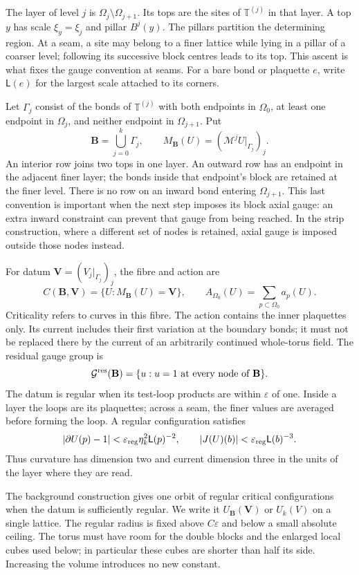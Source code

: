 \documentclass[11pt,letterpaper,reqno]{amsart}
\theoremstyle{definition}
\theoremstyle{remark}
\begin{document}
The layer of level $j$ is $\Omega_j\setminus\Omega_{j+1}$.
Its tops are the sites of $\mathbb T^{(j)}$ in that layer. A
top $y$ has scale $\xi_y=\xi_j$ and pillar $B^j(y)$.
The pillars partition the determining region. At a seam, a site
may belong to a finer lattice while lying in a pillar of a
coarser level; following its successive block centres leads to
its top. This ascent is what fixes the gauge convention at seams.
For a bare bond or plaquette $e$, write $\mathsf L(e)$ for the
largest scale attached to its corners.

Let $\Gamma_j$ consist of the bonds of $\mathbb T^{(j)}$
with both endpoints in $\Omega_0$, at least one endpoint in
$\Omega_j$, and neither endpoint in $\Omega_{j+1}$. Put
\[
 \mathbf B=\bigcup_{j=0}^k\Gamma_j,\qquad
 M_{\mathbf B}(U)=(\mathcal M^jU|_{\Gamma_j})_j.
\]
An interior row joins two tops in one layer. An outward row
has an endpoint in the adjacent finer layer; the bonds inside
that endpoint's block are retained at the finer level. There is
no row on an inward bond entering $\Omega_{j+1}$. This last
convention is important when the next step imposes its block
axial gauge: an extra inward constraint can prevent that gauge
from being reached. In the strip construction, where a different
set of nodes is retained, axial gauge is imposed outside those
nodes instead.

For datum $\mathbf V=(V_j|_{\Gamma_j})_j$, the fibre and action
are
\[
 C(\mathbf B,\mathbf V)=\{U:M_{\mathbf B}(U)=\mathbf V\},
 \qquad A_{\Omega_0}(U)=\sum_{p\subset\Omega_0}a_p(U).
\]
Criticality refers to curves in this fibre. The action contains
the inner plaquettes only. Its current includes their first
variation at the boundary bonds; it must not be replaced there
by the current of an arbitrarily continued whole-torus field.
The residual gauge group is
\[
 \mathcal G^{\rm res}(\mathbf B)
       =\{u:u=1\text{ at every node of }\mathbf B\}.
\]
The datum is regular when its test-loop products are within
$\varepsilon$ of one. Inside a layer the loops are its
plaquettes; across a seam, the finer values are averaged before
forming the loop. A regular configuration satisfies
\[
 |\partial U(p)-1|<\varepsilon_{\rm reg}\eta_k^2
                                      \mathsf L(p)^{-2},
 \qquad |J(U)(b)|<\varepsilon_{\rm reg}\mathsf L(b)^{-3}.
\]
Thus curvature has dimension two and current dimension three
in the units of the layer where they are read.

The background construction gives one orbit of regular critical
configurations when the datum is sufficiently regular. We write
it $U_{\mathbf B}(\mathbf V)$ or $U_k(V)$ on a single lattice.
The regular radius is fixed above $C\varepsilon$ and below a
small absolute ceiling. The torus must have room for the double
blocks and the enlarged local cubes used below; in particular
these cubes are shorter than half its side. Increasing the
volume introduces no new constant.
\end{document}
